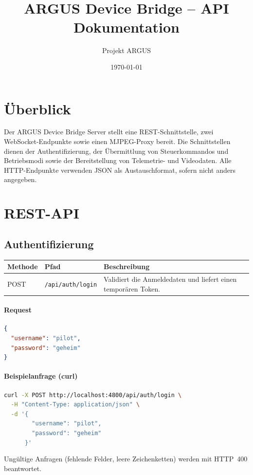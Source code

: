 \documentclass[a4paper,11pt]{article}
\title{ARGUS Device Bridge -- API Dokumentation}
\author{Projekt ARGUS}
\date{\today}
\begin{document}
\maketitle
\tableofcontents

\section{Überblick}
Der ARGUS Device Bridge Server stellt eine REST-Schnittstelle, zwei WebSocket-Endpunkte sowie
 einen MJPEG-Proxy bereit. Die Schnittstellen dienen der Authentifizierung, der Übermittlung von
 Steuerkommandos und Betriebsmodi sowie der Bereitstellung von Telemetrie- und Videodaten.
 Alle HTTP-Endpunkte verwenden JSON als Austauschformat, sofern nicht anders angegeben.

\section{REST-API}
\subsection{Authentifizierung}
\begin{longtable}{p{3.2cm}p{3cm}p{7.5cm}}
\textbf{Methode} & \textbf{Pfad} & \textbf{Beschreibung}\\\hline
POST & \texttt{/api/auth/login} & Validiert die Anmeldedaten und liefert einen temporären Token.\\
\end{longtable}

\paragraph{Request}
\begin{lstlisting}[language=json]
{
  "username": "pilot",
  "password": "geheim"
}
\end{lstlisting}

\paragraph{Beispielanfrage (curl)}
\begin{lstlisting}[language=bash]
curl -X POST http://localhost:4800/api/auth/login \
  -H "Content-Type: application/json" \
  -d '{
        "username": "pilot",
        "password": "geheim"
      }'
\end{lstlisting}

Ungültige Anfragen (fehlende Felder, leere Zeichenketten) werden mit HTTP~400 beantwortet.
\end{document}
